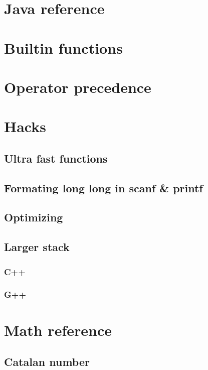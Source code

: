 \documentclass[UTF8,a4paper]{report}
\begin{document}
		\section{Java reference}
			
		\section{Builtin functions}
			
		\section{Operator precedence}
			
		\section{Hacks}
			\subsection{Ultra fast functions}
				
			\subsection{Formating long long in scanf \& printf}
				
			\subsection{Optimizing}
				
			\subsection{Larger stack}
				\subsubsection{C++}
					
				\subsubsection{G++}
					
		\section{Math reference}
			\subsection{Catalan number}
				
\end{document}

